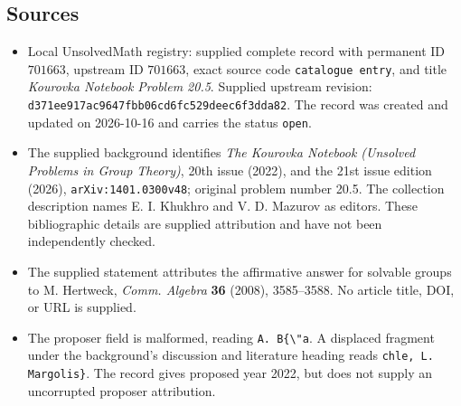 \documentclass[11pt]{article}
\begin{document}
\subsection{Sources}
\begin{itemize}
\item Local UnsolvedMath registry: supplied complete record with permanent ID \(701663\), upstream ID \(701663\), exact source code \texttt{catalogue entry}, and title \emph{Kourovka Notebook Problem 20.5}. Supplied upstream revision: \texttt{d371ee917ac9647fbb06cd6fc529deec6f3dda82}. The record was created and updated on 2026-10-16 and carries the status \texttt{open}.
\item The supplied background identifies \emph{The Kourovka Notebook (Unsolved Problems in Group Theory)}, 20th issue (2022), and the 21st issue edition (2026), \texttt{arXiv:1401.0300v48}; original problem number 20.5. The collection description names E. I. Khukhro and V. D. Mazurov as editors. These bibliographic details are supplied attribution and have not been independently checked.
\item The supplied statement attributes the affirmative answer for solvable groups to M. Hertweck, \emph{Comm. Algebra} \textbf{36} (2008), 3585--3588. No article title, DOI, or URL is supplied.
\item The proposer field is malformed, reading \texttt{A. B\{\textbackslash{}"a}. A displaced fragment under the background's discussion and literature heading reads \texttt{chle, L. Margolis\}}. The record gives proposed year 2022, but does not supply an uncorrupted proposer attribution.
\end{itemize}
\end{document}
